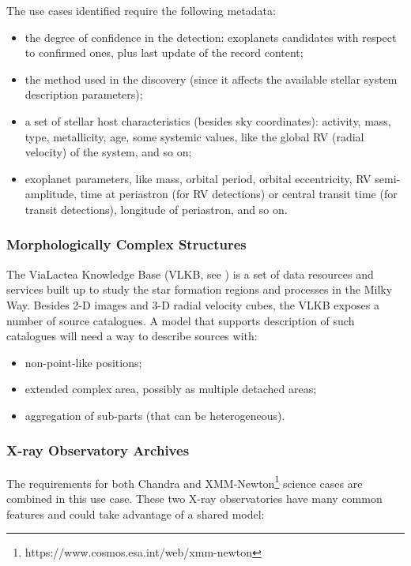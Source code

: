 The use cases identified require the following metadata:
\begin{itemize}[noitemsep,topsep=0pt,parsep=0pt,partopsep=0pt]
	\item the degree of confidence in the detection: exoplanets candidates
          with respect to confirmed ones, plus last update of the record content;
	\item the method used in the discovery (since it affects the available
          stellar system description parameters);
	\item a set of stellar host characteristics (besides sky coordinates):
          activity, mass, type, metallicity, age, some systemic values,
          like the global RV (radial velocity) of the system, and so on;
	\item exoplanet parameters, like mass, orbital period, orbital
          eccentricity, RV semi-amplitude, time at periastron (for RV detections)
          or central transit time (for transit detections), longitude of periastron,
          and so on.
\end{itemize}
 
 
\subsubsection{Morphologically Complex Structures}
The ViaLactea Knowledge Base (VLKB, see \cite{2016SPIE.9913E..0HM}) is a set of data
resources and services built up to study the star formation regions and
processes in the Milky Way. Besides 2-D images and 3-D radial velocity
cubes, the VLKB exposes a number of source catalogues.
A model that supports description of such catalogues will need a
way to describe sources with:
\begin{itemize}[noitemsep,topsep=0pt,parsep=0pt,partopsep=0pt]
	\item non-point-like positions;
	\item extended complex area, possibly as multiple detached areas;
	\item aggregation of sub-parts (that can be heterogeneous).
\end{itemize}

\subsubsection{X-ray Observatory Archives}

The requirements for both Chandra
and XMM-Newton\footnote{https://www.cosmos.esa.int/web/xmm-newton} science cases
are combined in this use case.
These two X-ray observatories have many common features and could take advantage of a shared model:

